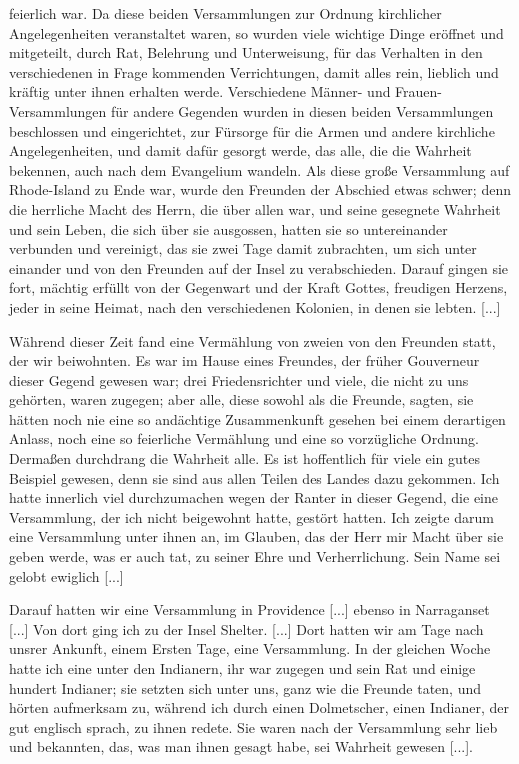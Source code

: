 feierlich war. Da diese beiden Versammlungen zur Ordnung
kirchlicher Angelegenheiten veranstaltet waren, so wurden viele
wichtige Dinge eröffnet und mitgeteilt, durch Rat, 
Belehrung und Unterweisung, 
für das Verhalten in den verschiedenen in Frage
kommenden Verrichtungen, damit alles rein, lieblich und kräftig
unter ihnen erhalten werde. Verschiedene Männer- und Frauen-
Versammlungen für andere Gegenden wurden in diesen beiden
Versammlungen beschlossen und eingerichtet, zur Fürsorge für die
Armen und andere kirchliche Angelegenheiten, und damit dafür
gesorgt werde, das alle, die die Wahrheit bekennen, auch nach
dem Evangelium wandeln. Als diese große Versammlung auf
Rhode-Island zu Ende war, wurde den Freunden der Abschied
etwas schwer; denn die herrliche Macht des Herrn, die über allen
war, und seine gesegnete Wahrheit und sein Leben, die sich über sie
ausgossen, hatten sie so untereinander verbunden und vereinigt,
das sie zwei Tage damit zubrachten, um sich unter einander und
von den Freunden auf der Insel zu verabschieden. Darauf gingen
sie fort, mächtig erfüllt von der Gegenwart und der Kraft Gottes,
freudigen Herzens, jeder in seine Heimat, nach den verschiedenen
Kolonien, in denen sie lebten. [...]

Während dieser Zeit fand eine Vermählung von zweien von
den Freunden statt, der wir beiwohnten. Es war im Hause
eines Freundes, der früher Gouverneur dieser Gegend gewesen war;
drei Friedensrichter und viele, die nicht zu uns 
gehörten, waren
zugegen; aber alle, diese sowohl als die Freunde, sagten, sie hätten
noch nie eine so andächtige Zusammenkunft gesehen bei einem
derartigen Anlass, noch eine so feierliche Vermählung und eine
so vorzügliche Ordnung. Dermaßen durchdrang die Wahrheit
alle. Es ist hoffentlich für viele ein gutes Beispiel gewesen, denn
sie sind aus allen Teilen des Landes dazu gekommen. Ich hatte
innerlich viel durchzumachen wegen der Ranter in dieser Gegend,
die eine Versammlung, der ich nicht beigewohnt hatte, gestört
hatten. Ich zeigte darum eine Versammlung unter ihnen an, im
Glauben, das der Herr mir Macht über sie geben werde, was
er auch tat, zu seiner Ehre und Verherrlichung. Sein Name
sei gelobt ewiglich [...]

Darauf hatten wir eine Versammlung in Providence [...]
ebenso in Narraganset [...] Von dort ging ich zu der Insel
Shelter. [...] Dort hatten wir am Tage nach unsrer Ankunft,
einem Ersten Tage, eine Versammlung. In der gleichen Woche hatte
ich eine unter den Indianern, 
ihr  war zugegen und sein
Rat und einige hundert Indianer; sie setzten sich unter uns, ganz
wie die Freunde taten, und hörten aufmerksam zu, während ich
durch einen Dolmetscher, einen Indianer, der gut englisch sprach,
zu ihnen redete. Sie waren nach der Versammlung sehr lieb
und bekannten, das, was man ihnen gesagt habe, sei Wahrheit
gewesen [...].

